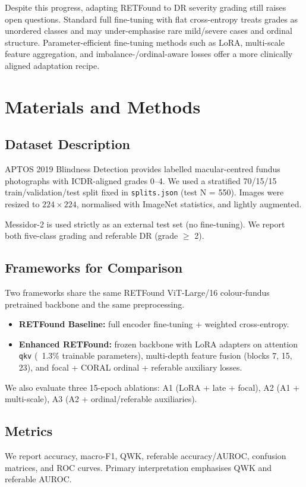 \documentclass[10pt,twocolumn]{article}
\begin{document}
Despite this progress, adapting RETFound to DR severity grading still raises open questions. Standard full fine-tuning with flat cross-entropy treats grades as unordered classes and may under-emphasise rare mild/severe cases and ordinal structure. Parameter-efficient fine-tuning methods such as LoRA, multi-scale feature aggregation, and imbalance-/ordinal-aware losses offer a more clinically aligned adaptation recipe.

\section{Materials and Methods}
\subsection{Dataset Description}
APTOS 2019 Blindness Detection provides labelled macular-centred fundus photographs with ICDR-aligned grades 0--4. We used a stratified 70/15/15 train/validation/test split fixed in \texttt{splits.json} (test N = 550). Images were resized to $224\times224$, normalised with ImageNet statistics, and lightly augmented.

Messidor-2 is used strictly as an external test set (no fine-tuning). We report both five-class grading and referable DR (grade $\geq$ 2).

\subsection{Frameworks for Comparison}
Two frameworks share the same RETFound ViT-Large/16 colour-fundus pretrained backbone and the same preprocessing.
\begin{itemize}[leftmargin=*,noitemsep,topsep=2pt]
  \item \textbf{RETFound Baseline:} full encoder fine-tuning + weighted cross-entropy.
  \item \textbf{Enhanced RETFound:} frozen backbone with LoRA adapters on attention \texttt{qkv} (~1.3\% trainable parameters), multi-depth feature fusion (blocks 7, 15, 23), and focal + CORAL ordinal + referable auxiliary losses.
\end{itemize}

We also evaluate three 15-epoch ablations: A1 (LoRA + late + focal), A2 (A1 + multi-scale), A3 (A2 + ordinal/referable auxiliaries).

\subsection{Metrics}
We report accuracy, macro-F1, QWK, referable accuracy/AUROC, confusion matrices, and ROC curves. Primary interpretation emphasises QWK and referable AUROC.
\end{document}
